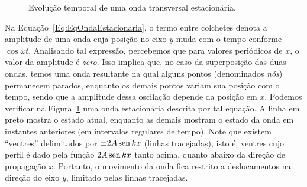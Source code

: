 \begin{figure}[b]\forceversofloat
\centering
\tikzfading[name=fade right, left color=transparent!100, right color=transparent!0]
\caption{Evolução temporal de uma onda transversal estacionária.}
\label{Fig:OndaEstacionaria}
\end{figure}

Na Equação~\eqref{Eq:EqOndaEstacionaria}, o termo entre colchetes denota a amplitude de uma onda cuja posição no eixo $y$ muda com o tempo conforme $\cos\omega t$. Analisando tal expressão, percebemos que para valores periódicos de $x$, o valor da amplitude é \emph{zero}. Isso implica que, no caso da superposição das duas ondas, temos uma onda resultante na qual alguns pontos (denominados \emph{nós}) permanecem parados, enquanto os demais pontos variam sua posição com o tempo, sendo que a amplitude dessa oscilação depende da posição em $x$. Podemos verificar na Figura~\ref{Fig:OndaEstacionaria} uma onda estacionária descrita por tal equação. A linha em preto mostra o estado atual, enquanto as demais mostram o estado da onda em instantes anteriores (em intervalos regulares de tempo). Note que existem ``ventres'' delimitados por $\pm 2A\operatorname{sen} kx$ (linhas tracejadas), isto é, ventres cujo perfil é dado pela função $2A\operatorname{sen} kx$ tanto acima, quanto abaixo da direção de propagação $x$. Portanto, o movimento da onda fica restrito a deslocamentos na direção do eixo $y$, limitado pelas linhas tracejadas.

